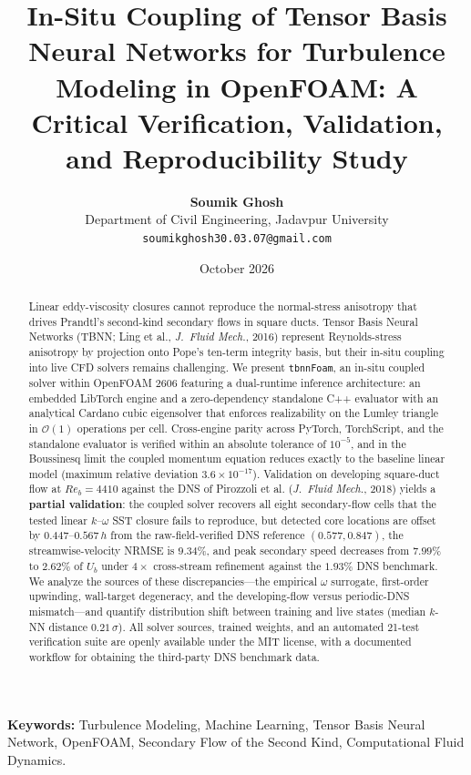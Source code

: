 \documentclass[11pt,a4paper]{article}
\title{\textbf{In-Situ Coupling of Tensor Basis Neural Networks for Turbulence Modeling in OpenFOAM: A Critical Verification, Validation, and Reproducibility Study}}
\author{
  \textbf{Soumik Ghosh}\\
  Department of Civil Engineering, Jadavpur University\\
  \texttt{soumikghosh30.03.07@gmail.com}
}
\date{October 2026}
\begin{document}
\maketitle

\begin{abstract}
Linear eddy-viscosity closures cannot reproduce the normal-stress anisotropy that drives Prandtl's second-kind secondary flows in square ducts. Tensor Basis Neural Networks (TBNN; Ling et al., \textit{J.~Fluid Mech.}, 2016) represent Reynolds-stress anisotropy by projection onto Pope's ten-term integrity basis, but their in-situ coupling into live CFD solvers remains challenging. We present \texttt{tbnnFoam}, an in-situ coupled solver within OpenFOAM 2606 featuring a dual-runtime inference architecture: an embedded LibTorch engine and a zero-dependency standalone C++ evaluator with an analytical Cardano cubic eigensolver that enforces realizability on the Lumley triangle in $\mathcal{O}(1)$ operations per cell. Cross-engine parity across PyTorch, TorchScript, and the standalone evaluator is verified within an absolute tolerance of $10^{-5}$, and in the Boussinesq limit the coupled momentum equation reduces exactly to the baseline linear model (maximum relative deviation $3.6 \times 10^{-17}$). Validation on developing square-duct flow at $Re_b = 4410$ against the DNS of Pirozzoli et al. (\textit{J.~Fluid Mech.}, 2018) yields a \textbf{partial validation}: the coupled solver recovers all eight secondary-flow cells that the tested linear $k\text{--}\omega$ SST closure fails to reproduce, but detected core locations are offset by $0.447\text{--}0.567\,h$ from the raw-field-verified DNS reference $(0.577, 0.847)$, the streamwise-velocity NRMSE is $9.34\%$, and peak secondary speed decreases from $7.99\%$ to $2.62\%$ of $U_b$ under $4\times$ cross-stream refinement against the $1.93\%$ DNS benchmark. We analyze the sources of these discrepancies---the empirical $\omega$ surrogate, first-order upwinding, wall-target degeneracy, and the developing-flow versus periodic-DNS mismatch---and quantify distribution shift between training and live states (median $k$-NN distance $0.21\,\sigma$). All solver sources, trained weights, and an automated 21-test verification suite are openly available under the MIT license, with a documented workflow for obtaining the third-party DNS benchmark data.
\end{abstract}

\vspace{0.5cm}
\noindent\textbf{Keywords:} Turbulence Modeling, Machine Learning, Tensor Basis Neural Network, OpenFOAM, Secondary Flow of the Second Kind, Computational Fluid Dynamics.
\end{document}
